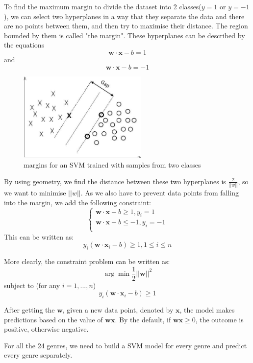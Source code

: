 \documentclass{vldb}
\begin{document}
\par  To find the maximum margin to divide the dataset into 2 classes($y=1$ or $y=-1$), we can select two hyperplanes in a way that they separate the data and there are no points between them, and then try to maximise their distance. The region bounded by them is called "the margin". These hyperplanes can be described by the equations
\begin{displaymath}
\mathbf{w}\cdot\mathbf{x}-b=1
\end{displaymath}
and
\begin{displaymath}
\mathbf{w}\cdot\mathbf{x}-b=-1
\end{displaymath}
\begin{figure}
\begin{center}
\includegraphics[width=2.50in]{SVM.jpeg}
\caption{margins for an SVM trained with samples from two classes}
\end{center}
\end{figure}
\par By using geometry, we find the distance between these two hyperplanes is $\frac{2}{||w||}$, so we want to minimise $||w||$. As we also have to prevent data points from falling into the margin, we add the following constraint:
\begin{displaymath}
\begin{cases}
\mathbf{w}\cdot\mathbf{x}-b\ge1,y_i=1\\
\mathbf{w}\cdot\mathbf{x}-b\le-1,y_i=-1\\
\end{cases}
\end{displaymath}
This can be written as:
\begin{displaymath}
y_i(\mathbf{w}\cdot\mathbf{x}_i-b)\ge1,1\le i \le n
\end{displaymath}
\par More clearly, the constraint problem can be written as:
\begin{displaymath}
\arg\min\frac{1}{2}||\mathbf{w}||^2
\end{displaymath}
subject to (for any $i = 1,...,n$)
\begin{displaymath}
y_i(\mathbf{w}\cdot\mathbf{x}_i-b)\ge1
\end{displaymath}
\par After getting the $\mathbf{w}$, given a new data point, denoted by $\mathbf{x}$, the model makes predictions based on the value of $\mathbf{w}\mathbf{x}$. By the default, if $\mathbf{w}\mathbf{x} \ge 0$, the outcome is positive, otherwise negative. 
\par For all the 24 genres, we need to build a SVM model for every genre and predict every genre separately.
\end{document}
